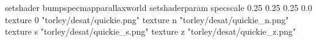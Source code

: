 setshader bumpspecmapparallaxworld
setshaderparam specscale 0.25 0.25 0.25 0.0
texture 0 "torley/desat/quickie.png"
texture n "torley/desat/quickie_n.png"
texture s "torley/desat/quickie_s.png"
texture z "torley/desat/quickie_z.png"

